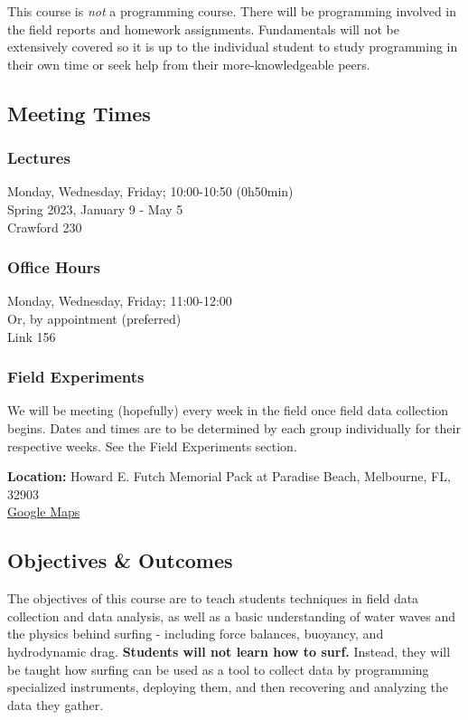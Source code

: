 \documentclass[
	letterpaper, %
	fontsize=10pt, %
	twoside=true, %
	numbers=noenddot, %
]{kaobook}
\begin{document}
This course is \emph{not} a programming course.
There will be programming involved in the field reports and homework assignments.
Fundamentals will not be extensively covered so it is up to the individual student to study programming in their own time or seek help from their more-knowledgeable peers.

\subsection*{Meeting Times} \label{meeting_times}
\subsubsection*{Lectures}
Monday, Wednesday, Friday; 10:00-10:50 (0h50min)\\
Spring 2023, January 9 - May 5\\
Crawford 230

\subsubsection*{Office Hours}
Monday, Wednesday, Friday; 11:00-12:00\\
Or, by appointment (preferred)\\
Link 156

\subsubsection*{Field Experiments}
We will be meeting (hopefully) every week in the field once field data collection begins. 
Dates and times are to be determined by each group individually for their respective weeks. See the Field Experiments section.

\textbf{Location:} Howard E. Futch Memorial Pack at Paradise Beach, Melbourne, FL, 32903 \\
\href{https://goo.gl/maps/tjdfqDwxHv3FmtNz8}{Google Maps}

\subsection*{Objectives \& Outcomes} \label{ssec:objectives_outcomes}
The objectives of this course are to teach students techniques in field data collection and data analysis, as well as a basic understanding of water waves and the physics behind surfing - including force balances, buoyancy, and hydrodynamic drag.
\textbf{Students will not learn how to surf.}
Instead, they will be taught how surfing can be used as a tool to collect data by programming specialized instruments, deploying them, and then recovering and analyzing the data they gather.
\end{document}
